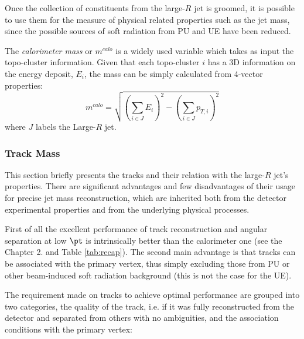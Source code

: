 Once the collection of constituents from the large-$R$ jet is groomed, it is possible to use them for the measure of physical related properties such as the jet mass, since the possible sources of soft radiation from PU and UE have been reduced.


The \textit{calorimeter mass} or $m^{calo}$ is a widely used variable which takes as input the topo-cluster information. Given that each topo-cluster $i$ has a 3D information on the energy deposit, $E_i$, the mass can be simply calculated from 4-vector properties:
$$m^{calo}=\sqrt{\left(\sum_{i\in J}E_i\right)^2-\left(\sum_{i\in J}p_{T,i}\right)^2} $$
where $J$ labels the Large-$R$ jet.

\subsubsection{Track Mass}
\label{sec:tracks}
This section briefly presents the tracks and their relation with the large-$R$ jet's properties.
There are significant advantages and few disadvantages of their usage for precise jet mass reconstruction, which are inherited both from the detector experimental properties and from the underlying physical processes. 

First of all the excellent performance of track reconstruction and angular separation at low $\pt$ is intrinsically better than the calorimeter one (see the Chapter 2. and Table \ref{tab:recap}).
The second main advantage is that tracks can be associated with the primary vertex, thus simply excluding those from PU or other beam-induced soft radiation background (this is not the case for the UE).

The requirement made on tracks to achieve optimal performance are grouped into two categories, the quality of the track, i.e. if it was fully reconstructed from the detector and separated from others with no ambiguities, and the association conditions with the primary vertex:

